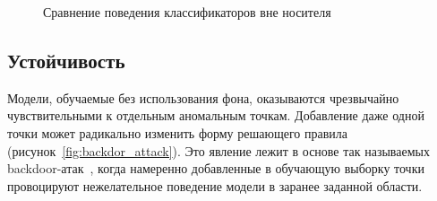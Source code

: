 \begin{figure}[ht]
    \caption{Сравнение поведения классификаторов вне носителя}
    \label{fig:spirals_example}
\end{figure}

\subsection{Устойчивость}

Модели, обучаемые без использования фона, оказываются чрезвычайно чувствительными к отдельным аномальным точкам. Добавление даже одной точки может радикально изменить форму решающего правила (рисунок~\cref{fig:backdor_attack}). Это явление лежит в основе так называемых backdoor-атак~\cite{guo2022overview}, когда намеренно добавленные в обучающую выборку точки провоцируют нежелательное поведение модели в заранее заданной области.

